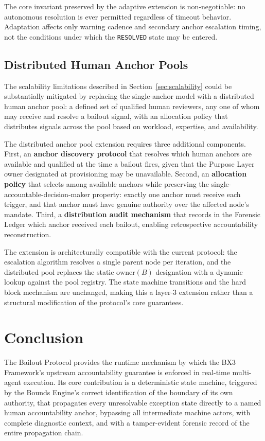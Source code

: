 The core invariant preserved by the adaptive extension is non-negotiable: no autonomous resolution is ever permitted regardless of timeout behavior. Adaptation affects only warning cadence and secondary anchor escalation timing, not the conditions under which the \texttt{RESOLVED} state may be entered.

\subsection{Distributed Human Anchor Pools}
\label{sec:distributed-anchors}

The scalability limitations described in Section~\ref{sec:scalability} could be substantially mitigated by replacing the single-anchor model with a distributed human anchor pool: a defined set of qualified human reviewers, any one of whom may receive and resolve a bailout signal, with an allocation policy that distributes signals across the pool based on workload, expertise, and availability.

The distributed anchor pool extension requires three additional components. First, an \textbf{anchor discovery protocol} that resolves which human anchors are available and qualified at the time a bailout fires, given that the Purpose Layer owner designated at provisioning may be unavailable. Second, an \textbf{allocation policy} that selects among available anchors while preserving the single-accountable-decision-maker property: exactly one anchor must receive each trigger, and that anchor must have genuine authority over the affected node's mandate. Third, a \textbf{distribution audit mechanism} that records in the Forensic Ledger which anchor received each bailout, enabling retrospective accountability reconstruction.

The extension is architecturally compatible with the current protocol: the escalation algorithm resolves a single parent node per iteration, and the distributed pool replaces the static $\text{owner}(B)$ designation with a dynamic lookup against the pool registry. The state machine transitions and the hard block mechanism are unchanged, making this a layer-3 extension rather than a structural modification of the protocol's core guarantees.

\section{Conclusion}
\label{sec:conclusion}

The Bailout Protocol provides the runtime mechanism by which the BX3 Framework's upstream accountability guarantee is enforced in real-time multi-agent execution. Its core contribution is a deterministic state machine, triggered by the Bounds Engine's correct identification of the boundary of its own authority, that propagates every unresolvable exception state directly to a named human accountability anchor, bypassing all intermediate machine actors, with complete diagnostic context, and with a tamper-evident forensic record of the entire propagation chain.

